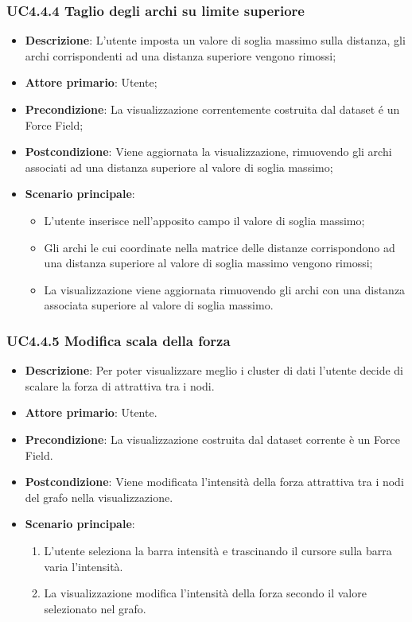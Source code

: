 \subsubsection{UC4.4.4 Taglio degli archi su limite superiore}
\label{ssub:uc4.4.4}
\begin{itemize}
    \item \textbf{Descrizione}:     L'utente imposta un valore di soglia massimo sulla distanza, gli archi corrispondenti ad una distanza superiore vengono rimossi;
    \item \textbf{Attore primario}: Utente;
    \item \textbf{Precondizione}:   La visualizzazione correntemente costruita dal dataset é un Force Field;
    \item \textbf{Postcondizione}:  Viene aggiornata la visualizzazione, rimuovendo gli archi associati ad una distanza superiore al valore di soglia massimo;
    \item \textbf{Scenario principale}:
    \begin{itemize}
        \item L'utente inserisce nell'apposito campo il valore di soglia massimo;
        \item Gli archi le cui coordinate nella matrice delle distanze corrispondono ad una distanza superiore al valore di soglia massimo vengono rimossi;
        \item La visualizzazione viene aggiornata rimuovendo gli archi con una distanza associata superiore al valore di soglia massimo.
    \end{itemize}
\end{itemize}

\subsubsection{UC4.4.5 Modifica scala della forza}
\label{ssub:uc4.4.5}
\begin{itemize}
    \item \textbf{Descrizione}: Per poter visualizzare meglio i cluster di dati l’utente 
                                decide di scalare la forza di attrattiva tra i nodi.

	
    \item \textbf{Attore primario}: Utente.
    
    \item \textbf{Precondizione}:   La visualizzazione costruita dal dataset corrente è un Force Field.
    \item \textbf{Postcondizione}:  Viene modificata l'intensità della forza attrattiva tra i nodi del grafo nella visualizzazione.

	\item \textbf{Scenario principale}:
        \begin{enumerate}
            \item L'utente seleziona la barra intensità e trascinando il cursore sulla barra varia l’intensità.
            \item La visualizzazione modifica l'intensità della forza secondo il valore selezionato nel grafo.
        \end{enumerate}
\end{itemize}

